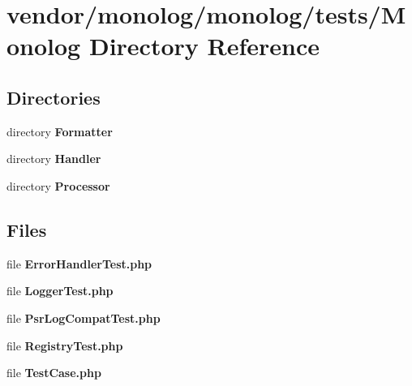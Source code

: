 \section{vendor/monolog/monolog/tests/\+Monolog Directory Reference}
\label{dir_a0d17a908e3e63d13c304544fe6e41b4}
\subsection*{Directories}
\begin{DoxyCompactItemize}
\item 
directory {\bf Formatter}
\item 
directory {\bf Handler}
\item 
directory {\bf Processor}
\end{DoxyCompactItemize}
\subsection*{Files}
\begin{DoxyCompactItemize}
\item 
file {\bf Error\+Handler\+Test.\+php}
\item 
file {\bf Logger\+Test.\+php}
\item 
file {\bf Psr\+Log\+Compat\+Test.\+php}
\item 
file {\bf Registry\+Test.\+php}
\item 
file {\bf Test\+Case.\+php}
\end{DoxyCompactItemize}
